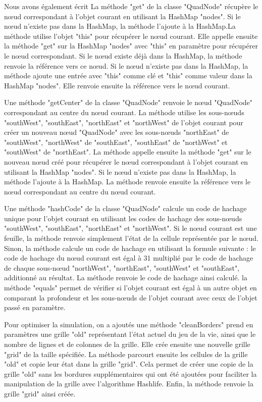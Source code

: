 Nous avons également écrit La méthode "get" de la classe "QuadNode" récupère le nœud correspondant à l'objet courant en utilisant la HashMap "nodes". Si le nœud n'existe pas dans la HashMap, la méthode l'ajoute à la HashMap.La méthode utilise l'objet "this" pour récupérer le nœud courant. Elle appelle ensuite la méthode "get" sur la HashMap "nodes" avec "this" en paramètre pour récupérer le nœud correspondant. Si le nœud existe déjà dans la HashMap, la méthode renvoie la référence vers ce nœud. Si le nœud n'existe pas dans la HashMap, la méthode ajoute une entrée avec "this" comme clé et "this" comme valeur dans la HashMap "nodes". Elle renvoie ensuite la référence vers le nœud courant.\newline

Une méthode "getCenter" de la classe "QuadNode" renvoie le nœud "QuadNode" correspondant au centre du nœud courant. La méthode utilise les sous-nœuds "southWest", "southEast", "northEast" et "northWest" de l'objet courant pour créer un nouveau nœud "QuadNode" avec les sous-nœuds "northEast" de "southWest", "northWest" de "southEast", "southEast" de "northWest" et "southWest" de "northEast". La méthode appelle ensuite la méthode "get" sur le nouveau nœud créé pour récupérer le nœud correspondant à l'objet courant en utilisant la HashMap "nodes". Si le nœud n'existe pas dans la HashMap, la méthode l'ajoute à la HashMap. La méthode renvoie ensuite la référence vers le nœud correspondant au centre du nœud courant.

Une  méthode "hashCode" de la classe "QuadNode" calcule un code de hachage unique pour l'objet courant en utilisant les codes de hachage des sous-nœuds "southWest", "southEast", "northEast" et "northWest". Si le nœud courant est une feuille, la méthode renvoie simplement l'état de la cellule représentée par le nœud. Sinon, la méthode calcule un code de hachage en utilisant la formule suivante : le code de hachage du nœud courant est égal à 31 multiplié par le code de hachage de chaque sous-nœud "northWest", "northEast", "southWest" et "southEast", additionné au résultat. La méthode renvoie le code de hachage ainsi calculé. la méthode "equals" permet de vérifier si l'objet courant est égal à un autre objet en comparant la profondeur et les sous-nœuds de l'objet courant avec ceux de l'objet passé en paramètre.

Pour optimiser la simulation, on a ajoutés une  méthode "cleanBorders" prend en paramètres une grille "old" représentant l'état actuel du jeu de la vie, ainsi que le nombre de lignes et de colonnes de la grille. Elle crée ensuite une nouvelle grille "grid" de la taille spécifiée. La méthode parcourt ensuite les cellules de la grille "old" et copie leur état dans la grille "grid". Cela permet de créer une copie de la grille "old" sans les bordures supplémentaires qui ont été ajoutées pour faciliter la manipulation de la grille avec l'algorithme Hashlife. 
Enfin, la méthode renvoie la grille "grid" ainsi créée.\newline  

